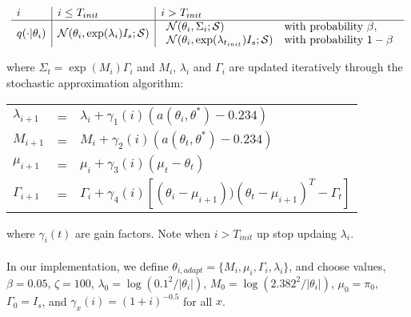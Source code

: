 \documentclass{article}
\begin{document}
\begin{equation}
\begin{array}{l | l | l}
\label{eq:proposal}

i & i \leq T_{init} & i > T_{init} \\ \hline
q(\cdot|\theta_i)&\mathcal{N}(\theta_i, \exp(\lambda_i)I_{s};\mathcal{S})  &


\begin{array}{ll}
\mathcal{N}(\theta_i, \Sigma_i;\mathcal{S}) & \text{with probability }\beta, \\
\mathcal{N}(\theta_i, \exp(\lambda_{t_{init}})I_{s};\mathcal{S}) & \text{with probability }1 - \beta \\ 
\end{array}
 \end{array}
 \end{equation}
 
 
where $\Sigma_t = \exp(M_i)\Gamma_i$ and $M_{i}$, $\lambda_i$ and $\Gamma_{i}$ are updated iteratively through the stochastic approximation algorithm:
 \begin{center}
 \begin{tabular}{l l l}
  $\lambda_{i+1}$ & = & $ \lambda_i + \gamma_1(i)(a(\theta_i, \theta^*) - 0.234) $\\
 $M_{i+1}$& = & $M_i + \gamma_2(i)(a(\theta_t, \theta^*)- 0.234) $ \\
 $\mu_{i+1}$ & = & $\mu_i + \gamma_3(i)(\mu_t - \theta_t) $ \\
 $\Gamma_{i+1}$ & = & $ \Gamma_i + \gamma_4(i)[(\theta_i - \mu_{i+1}))(\theta_t - \mu_{i+1})^T - \Gamma_t]$ \\
\end{tabular} 
 \end{center}
 
 where $ \gamma_i(t)$ are gain factors. Note when $i > T_{init}$ up stop updaing $\lambda_i$.
 
 
\paragraph{}In our implementation, we define $\theta_{i, adapt} = \{M_i, \mu_i, \Gamma_i, \lambda_i\}$, and choose values, $\beta = 0.05$, $\zeta = 100$,  $\lambda_0 = \log(0.1^2/|\theta_i|)$, $M_0 = \log(2.382^2/|\theta_i|)$,  $\mu_0 = \pi_0$,  $\Gamma_0 = I_s$, and $\gamma_x(i) = (1 + i)^{-0.5}$ for all $x$. 
\end{document}
